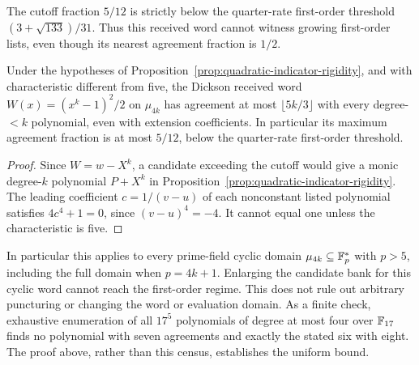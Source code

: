 The cutoff fraction $5/12$ is strictly below the quarter-rate
first-order threshold $(3+\sqrt{133})/31$. Thus this received word
cannot witness growing first-order lists, even though its nearest
agreement fraction is $1/2$.

\begin{corollary}\label{cor:dickson-word-first-order-barrier}
Under the hypotheses of Proposition~\ref{prop:quadratic-indicator-rigidity},
and with characteristic different from five, the Dickson received word
$W(x)=(x^k-1)^2/2$ on $\mu_{4k}$ has agreement at most
$\lfloor5k/3\rfloor$ with every degree-$<k$ polynomial, even with
extension coefficients. In particular its maximum agreement fraction
is at most $5/12$, below the quarter-rate first-order threshold.
\end{corollary}
\begin{proof}
Since $W=w-X^k$, a candidate exceeding the cutoff would give a monic
degree-$k$ polynomial $P+X^k$ in Proposition~\ref{prop:quadratic-indicator-rigidity}.
The leading coefficient $c=1/(v-u)$ of each nonconstant listed
polynomial satisfies $4c^4+1=0$, since $(v-u)^4=-4$.
It cannot equal one unless the characteristic is five.
\end{proof}

In particular this applies to every prime-field cyclic domain
$\mu_{4k}\subseteq\mathbb F_p^*$ with $p>5$, including the full domain
when $p=4k+1$. Enlarging the candidate bank for this cyclic word cannot
reach the first-order regime. This does not rule out arbitrary
puncturing or changing the word or evaluation domain.
As a finite check, exhaustive enumeration
of all $17^5$ polynomials of degree at most four over $\mathbb F_{17}$ finds
no polynomial with seven agreements and exactly the stated six with
eight. The proof above, rather than this census, establishes the
uniform bound.
